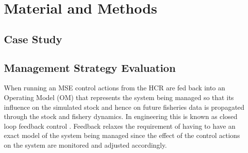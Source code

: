 \documentclass[%
nonumbib,      %
%
]{nrc1}                          %
\begin{document}
\section*{Material and Methods}

\subsection*{Case Study}





\subsection*{Management Strategy Evaluation}

When running an MSE control actions from the HCR are fed back into an Operating Model (OM) that represents the system being managed so that its influence on the simulated stock and hence on future fisheries data is propagated through the stock and fishery dynamics. In engineering this is known as closed loop feedback control \citep{zhou1996robust}. Feedback relaxes the requirement of having to have an exact model of the system being managed since the effect of the control actions on the system are monitored and adjusted accordingly.
\end{document}
